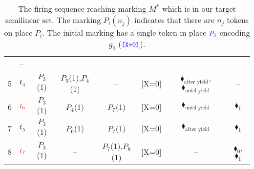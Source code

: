 \begin{table}[H]
{\begin{tabular}{c l c c c c c c}
			& --                                    \\
			5 & $t_4$                                  
			& {\color{blue}$P_3$(1)}                  
			& $P_5$(1),$P_4$(1)                          
			& --                                    
			&                                   {\color{blue}[X=0]}     
			&                                    {\color{black}$\blacklozenge_\text{after yield}$}, {\color{black}$\blacklozenge_\text{until yield}$}   
			& --                                    \\
			6 & $\textcolor{red}{t_6}$                     
			& {\color{blue}$P_3$(1)}                  
			& $P_4$(1)                                
			& {\color{red}$P_7$(1)}                    
			&                                      	{\color{blue}[X=0]}  
			&                                    {\color{black}$\blacklozenge_\text{until yield}$}   
			&                                   {\color{red}$\blacklozenge_1$}     \\
			7 & $t_5$                                  
			& {\color{blue}$P_3$(1)}                  
			& $P_6$(1)                                
			& {\color{red}$P_7$(1)}                    
			&                                   {\color{blue}[X=0]}    
			&                                    {\color{black}$\blacklozenge_\text{after yield}$}      
			&                                   {\color{red}$\blacklozenge_1$}        \\
			8 & $\textcolor{red}{t_7}$                     
			& {\color{blue}$P_3$(1)}                                  
			& --                                    
			& {\color{red}$P_7$(1),\color{red}$P_8$(1)}    
			&                                   {\color{blue}[X=0]}    
			&                                   --    
			&                                   {\color{red}$\blacklozenge_0$}, {\color{red}$\blacklozenge_1$}       \\
			\bottomrule
		\end{tabular}
	}
	\caption{The firing sequence reaching marking $M^*$ which is in our target semilinear set. The marking $P_i(n_j)$ indicates that there are $n_j$ tokens on place $P_i$. The initial marking has a single token in place $\textcolor{blue}{P_3}$ encoding $g_0$ ($\textcolor{blue}{\texttt{[X=0]}}$).}
	\label{tab:PetriNetFiringCounterexample}
\end{table}

